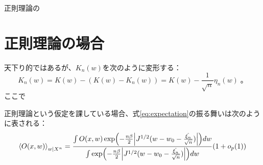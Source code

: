 \documentclass[dvipdfmx]{jsarticle}
\begin{document}
正則理論の

\section{正則理論の場合}





天下り的ではあるが、$K_n(w)$を次のように変形する：
\begin{equation}
    K_n(w) = K(w) - (K(w)-K_n(w)) = K(w) - \frac{1}{\sqrt{n}}\eta_n(w)\;。
\end{equation}
ここで






\begin{mybox}
    正則理論という仮定を課している場合、式\eqref{eq:expectation}の振る舞いは次のように表される：
    \begin{equation}
        \ev{O(x,w)}_{w|X^n}
         = \frac{\int O(x,w)\exp(-\frac{n\beta}{2}\abs{J^{1/2}(w-w_0-\frac{\hat{\xi_n}}{\sqrt{n}})})dw}
         {\int \exp(-\frac{n\beta}{2}\abs{J^{1/2}(w-w_0-\frac{\hat{\xi_n}}{\sqrt{n}})})dw}(1+o_p(1))
    \end{equation}
\end{mybox}
\end{document}
